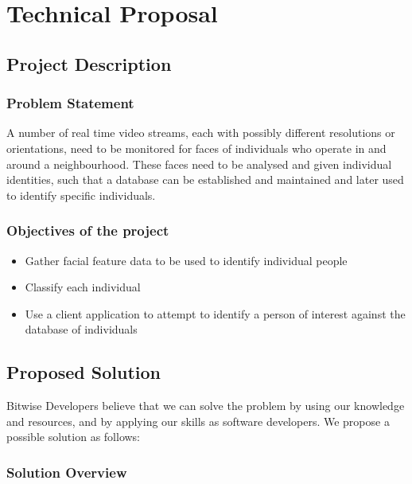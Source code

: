 \documentclass[a4paper]{article}
\begin{document}
	\section{Technical Proposal}
	
		\subsection{Project Description}
		
			\subsubsection{Problem Statement}
			
			A number of real time video streams, each with possibly different resolutions or orientations, need to be monitored for
			faces of individuals who operate in and around a neighbourhood. These faces need to be analysed and given individual identities,
			such that a database can be established and maintained and later used to identify specific individuals.
			
			\subsubsection{Objectives of the project}
			
				\begin{itemize}
				
					\item Gather facial feature data to be used to identify individual people
					
					\item Classify each individual
					
					\item Use a client application to attempt to identify a person of interest against the database of individuals
			
				\end{itemize}
			
		\subsection{Proposed Solution}
		
		Bitwise Developers believe that we can solve the problem by using our knowledge and resources, and by applying our skills as software developers.
		We propose a possible solution as follows:
		
			\subsubsection{Solution Overview}
			
\end{document}

